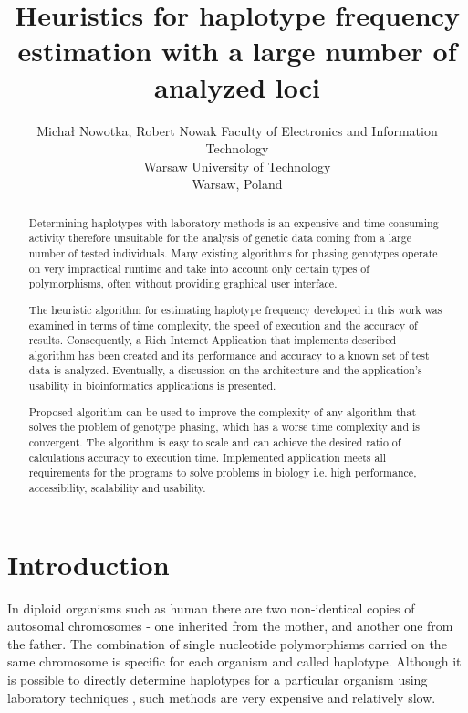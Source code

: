 \documentclass[]{spie}
\title{Heuristics for haplotype frequency estimation with a large number of analyzed loci}
\author{Micha\l{} Nowotka, Robert Nowak
  \skiplinehalf
  Faculty of Electronics and Information Technology\\
  Warsaw University of Technology\\
  Warsaw, Poland\\
}
\begin{document}
\maketitle

\begin{abstract}
Determining haplotypes with laboratory methods is an expensive and time-consuming
activity therefore unsuitable for the analysis of genetic data coming from a large number of tested
individuals. Many existing algorithms for phasing genotypes operate on very impractical runtime and
take into account only certain types of polymorphisms, often without providing graphical user interface.

The heuristic algorithm for estimating haplotype frequency developed in this work was
examined in terms of time complexity, the speed of execution and the accuracy of results. Consequently,
a Rich Internet Application that implements described algorithm has been created and its performance
and accuracy to a known set of test data is analyzed. Eventually, a discussion on the architecture and
the application’s usability in bioinformatics applications is presented.

Proposed algorithm can be used to improve the complexity of any algorithm that solves
the problem of genotype phasing, which has a worse time complexity and is convergent. The algorithm
is easy to scale and can achieve the desired ratio of calculations accuracy to execution time. Implemented
application meets all requirements for the programs to solve problems in biology i.e. high performance,
accessibility, scalability and usability.
\end{abstract}


\section{Introduction}
In diploid organisms such as human there are two non-identical copies of autosomal chromosomes - one inherited from the mother, and another one from the father.
The combination of single nucleotide polymorphisms carried on the same chromosome is specific for each organism and called haplotype.
Although it is possible to directly determine haplotypes for a particular organism using laboratory techniques \cite{douglas},
such methods are very expensive and relatively slow.
\end{document}
